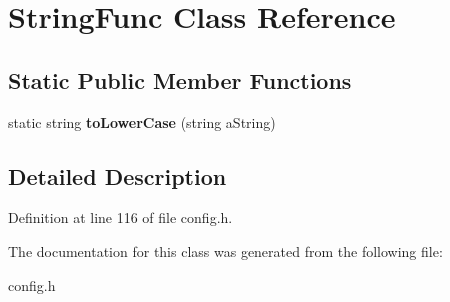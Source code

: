 \hypertarget{class_string_func}{}\section{String\+Func Class Reference}
\label{class_string_func}
\subsection*{Static Public Member Functions}
\begin{DoxyCompactItemize}
\item 
\hypertarget{class_string_func_ae4f83e5ac07871e85547dc287bde3ff5}{}\label{class_string_func_ae4f83e5ac07871e85547dc287bde3ff5} 
static string {\bfseries to\+Lower\+Case} (string a\+String)
\end{DoxyCompactItemize}


\subsection{Detailed Description}


Definition at line 116 of file config.\+h.



The documentation for this class was generated from the following file\+:\begin{DoxyCompactItemize}
\item 
config.\+h\end{DoxyCompactItemize}
